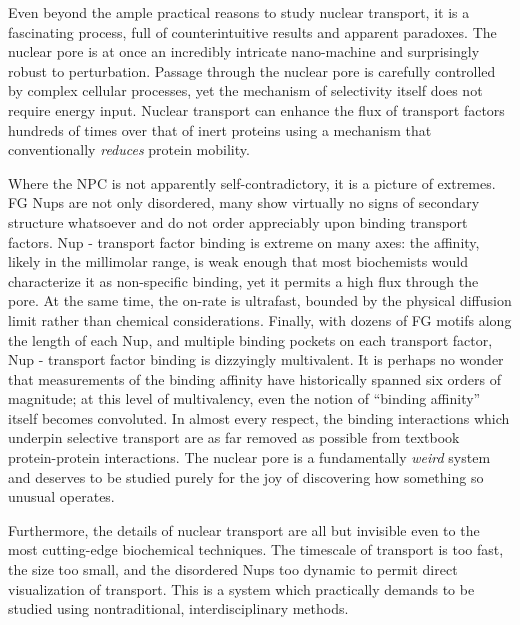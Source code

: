 Even beyond the ample practical reasons to study nuclear transport, it is a fascinating process, full of counterintuitive results and apparent paradoxes.  The nuclear pore is at once an incredibly intricate nano-machine and surprisingly robust to perturbation.  Passage through the nuclear pore is carefully controlled by complex cellular processes, yet the mechanism of selectivity itself does not require energy input.  Nuclear transport can enhance the flux of transport factors hundreds of times over that of inert proteins using a mechanism that conventionally \textit{reduces} protein mobility.

Where the NPC is not apparently self-contradictory, it is a picture of extremes.  FG Nups are not only disordered, many show virtually no signs of secondary structure whatsoever and do not order appreciably upon binding transport factors.  Nup - transport factor binding is extreme on many axes: the affinity, likely in the millimolar range, is weak enough that most biochemists would characterize it as non-specific binding, yet it permits a high flux through the pore.  At the same time, the on-rate is ultrafast, bounded by the physical diffusion limit rather than chemical considerations.  Finally, with dozens of FG motifs along the length of each Nup, and multiple binding pockets on each transport factor, Nup - transport factor binding is dizzyingly multivalent.  It is perhaps no wonder that measurements of the binding affinity have historically spanned six orders of magnitude; at this level of multivalency, even the notion of ``binding affinity'' itself becomes convoluted.  In almost every respect, the binding interactions which underpin selective transport are as far removed as possible from textbook protein-protein interactions.  The nuclear pore is a fundamentally \textit{weird} system and deserves to be studied purely for the joy of discovering how something so unusual operates.

Furthermore, the details of nuclear transport are all but invisible even to the most cutting-edge biochemical techniques.  The timescale of transport is too fast, the size too small, and the disordered Nups too dynamic to permit direct visualization of transport.  This is a system which practically demands to be studied using nontraditional, interdisciplinary methods. 

